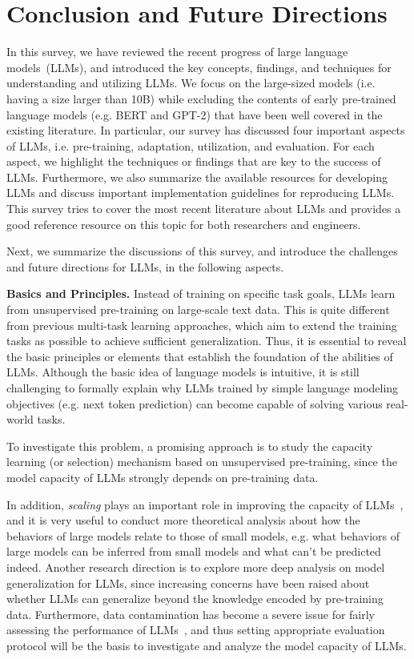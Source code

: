 \section{Conclusion and Future Directions}
\label{sec-con}
In this survey, we have reviewed the recent progress of large language models~(LLMs), and introduced the key concepts, findings, and techniques for understanding and utilizing LLMs. We focus on the large-sized models (i.e. having a size larger than 10B) while excluding the contents of early pre-trained language models (e.g. BERT and GPT-2) that  have been well covered in the existing literature. In particular, our survey has discussed four important aspects of LLMs, i.e. pre-training, adaptation, utilization, and evaluation. For each aspect, we highlight the techniques or findings that are key to the success of LLMs. Furthermore, we also summarize the available resources for developing LLMs and discuss important implementation guidelines for reproducing LLMs. This survey tries to cover the most recent literature about LLMs and provides a good reference resource on this topic for both researchers and engineers.

Next, we summarize the discussions of this survey, and introduce the challenges and future directions for LLMs, in the following aspects. 

\textbf{Basics and Principles.} Instead of training on specific task goals, LLMs learn from unsupervised pre-training on large-scale text data. This is quite different from previous multi-task learning approaches, which aim to extend the training tasks as possible to achieve sufficient generalization. Thus, it is essential to reveal the basic principles  or elements that establish the foundation of the abilities of LLMs. Although the basic idea of language models is intuitive, it is still challenging to formally explain why LLMs trained by  simple language modeling objectives (e.g. next token prediction) can become capable of solving various real-world tasks. 

To investigate this problem, a promising approach is to study the capacity learning (or selection) mechanism based on unsupervised pre-training, since the model capacity of LLMs strongly depends on  pre-training data.  

In addition, \emph{scaling}   plays an important role in improving the capacity of LLMs~\cite{Brown-NeurIPS-2020-Language,Wei-arxiv-2022-Emergent,Rae-arxiv-2021-Scaling}, and it is very useful to conduct more theoretical analysis about how the behaviors of large models relate to those of small models, e.g. what behaviors of large models can be inferred from small models and what can't be predicted indeed. Another research direction is to explore more deep analysis on model generalization for LLMs, since increasing concerns have been raised about whether LLMs can generalize beyond the knowledge encoded by pre-training data. Furthermore, data contamination has become a severe issue for fairly assessing the performance of LLMs~\cite{zhou-arxiv-2023-dont}, and thus setting appropriate evaluation protocol will be the basis to investigate and analyze the model capacity of LLMs. 

